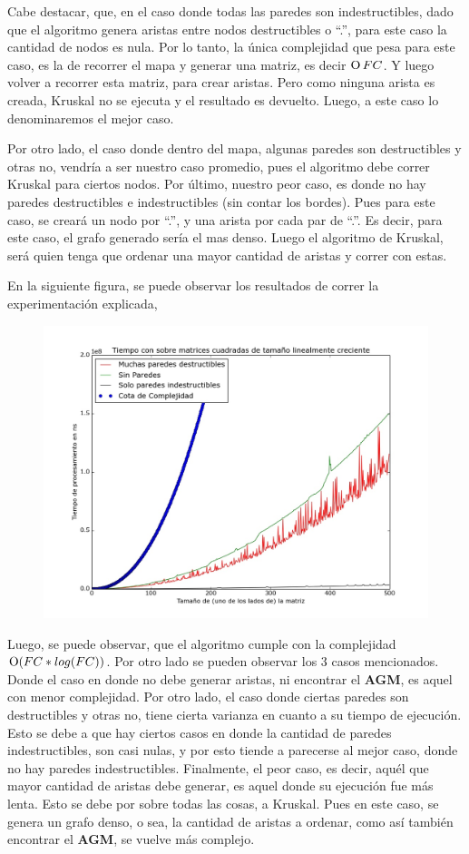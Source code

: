     Cabe destacar, que, en el caso donde todas las paredes son indestructibles, dado que el algoritmo genera aristas entre nodos destructibles o “.”, para este caso la cantidad de nodos es nula. Por lo tanto, la única complejidad que pesa para este caso, es la de recorrer el mapa y generar una matriz, es decir $\operatorname{O}{FC}$. Y luego volver a recorrer esta matriz, para crear aristas. Pero como ninguna arista es creada, Kruskal no se ejecuta y el resultado es devuelto. Luego, a este caso lo denominaremos el mejor caso. \par
    Por otro lado, el caso donde dentro del mapa, algunas paredes son destructibles  y otras no, vendría a ser nuestro caso promedio, pues el algoritmo debe correr Kruskal para ciertos nodos. Por último, nuestro peor caso, es donde no hay paredes destructibles e indestructibles (sin contar los bordes). Pues para este caso, se creará un nodo por “.”, y una arista por cada par de “.”. Es decir, para este caso, el grafo generado sería el mas denso. Luego el algoritmo de Kruskal, será quien tenga que ordenar una mayor cantidad de aristas y correr con estas. \par

    En la siguiente figura, se puede observar los resultados de correr la experimentación explicada,

    \begin{figure}[H]
      \begin{center}
        \includegraphics[width=0.7\columnwidth]{../exp/ej2casosFijos.jpeg}
        \caption{}
      \end{center}
  	\end{figure}

  	Luego, se puede observar, que el algoritmo cumple con la complejidad $\operatorname{O}(FC*log(FC))$. Por otro lado se pueden observar los 3 casos mencionados. Donde el caso en donde no debe generar aristas, ni encontrar el \textbf{AGM}, es aquel con menor complejidad. Por otro lado, el caso donde ciertas paredes son destructibles y otras no, tiene cierta varianza en cuanto a su tiempo de ejecución. Esto se debe a que hay ciertos casos en donde la cantidad de paredes indestructibles, son casi nulas, y por esto tiende a parecerse al mejor caso, donde no hay paredes indestructibles. Finalmente, el peor caso, es decir, aquél que mayor cantidad de aristas debe generar, es aquel donde su ejecución fue más lenta. Esto se debe por sobre todas las cosas, a Kruskal. Pues en este caso, se genera un grafo denso, o sea, la cantidad de aristas a ordenar, como así también encontrar el \textbf{AGM}, se vuelve más complejo.

